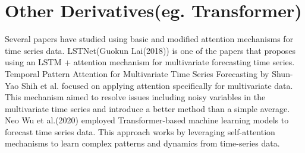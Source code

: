 \section{Other Derivatives(eg. Transformer)}

Several papers have studied using basic and modified attention mechanisms for time series data. LSTNet(Guokun Lai(2018)) is one of the papers that proposes using an LSTM + attention mechanism for multivariate forecasting time series. Temporal Pattern Attention for Multivariate Time Series Forecasting by Shun-Yao Shih et al. focused on applying attention specifically for multivariate data. This mechanism aimed to resolve issues including noisy variables in the multivariate time series and introduce a better method than a simple average. Neo Wu et al.(2020) employed Transformer-based machine learning models to forecast time series data. This approach works by leveraging self-attention mechanisms to learn complex patterns and dynamics from time-series data.